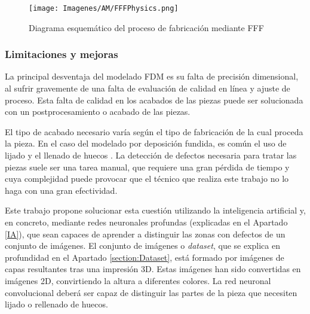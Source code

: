 \documentclass{report}
\begin{document}
\vspace{0.4cm}
\begin{figure}[H]
    \centering
    \texttt{[image: Imagenes/AM/FFFPhysics.png]}
    \caption{Diagrama esquemático del proceso de fabricación mediante FFF \cite{AMFFFProcess}}
    \label{fig:FFFPhysics}
\end{figure}
\vspace{0.4cm}


\subsubsection{Limitaciones y mejoras}

La principal desventaja del modelado FDM es su falta de precisión
dimensional, al sufrir gravemente de una falta de evaluación de calidad en línea y ajuste de proceso. Esta falta de calidad en los acabados de las piezas puede ser solucionada con un postprocesamiento o acabado de las piezas.

El tipo de acabado necesario varía según el tipo de fabricación de la cual proceda la pieza. En el caso del modelado por deposición fundida, es común el uso de lijado y el llenado de huecos \cite{AMFFFPostProcessing}. La detección de defectos necesaria para tratar las piezas suele ser una tarea manual, que requiere una gran pérdida de tiempo y cuya complejidad puede provocar que el técnico que realiza este trabajo no lo haga con una gran efectividad.

Este trabajo propone solucionar esta cuestión utilizando la inteligencia artificial y, en concreto, mediante redes neuronales profundas (explicadas en el Apartado \ref{IA}), que sean capaces de aprender a distinguir las zonas con defectos de un conjunto de imágenes. El conjunto de imágenes o \textit{dataset}, que se explica en profundidad en el Apartado \ref{section:Dataset}, está formado por imágenes de capas resultantes tras una impresión 3D. Estas imágenes han sido convertidas en imágenes 2D, convirtiendo la altura a diferentes colores. La red neuronal convolucional deberá ser capaz de distinguir las partes de la pieza que necesiten lijado o rellenado de huecos.
\end{document}
